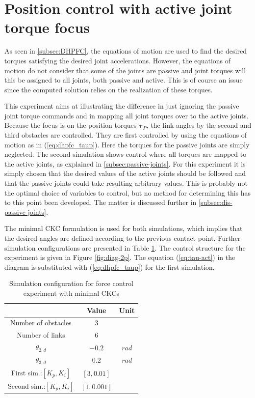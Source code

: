\section{Position control with active joint torque focus}\label{sec:pas-pos}

As seen in \ref{subsec:DHPFC}, the equations of motion are used to find the desired torques satisfying the desired joint accelerations. However, the equations of motion do not consider that some of the joints are passive and joint torques will this be assigned to all joints, both passive and active. This is of course an issue since the computed solution relies on the realization of these torques.

This experiment aims at illustrating the difference in just ignoring the passive joint torque commands and in mapping all joint torques over to the active joints. Because the focus is on the position torques $\boldsymbol{\tau}_P$, the link angles by the second and third obstacles are controlled. They are first controlled by using the equations of motion as in (\ref{eq:dhpfc_taup}). Here the torques for the passive joints are simply neglected. The second simulation shows control where all torques are mapped to the active joints, as explained in \ref{subsec:passive-joints}. For this experiment it is simply chosen that the desired values of the active joints should be followed and that the passive joints could take resulting arbitrary values. This is probably not the optimal choice of variables to control, but no method for determining this has to this point been developed. The matter is discussed further in \ref{subsec:dis-passive-joints}.

The minimal CKC formulation is used for both simulations, which implies that the desired angles are defined according to the previous contact point. Further simulation configurations are presented in Table \ref{tab:exp_2xp}. The control structure for the experiment is given in Figure \ref{fig:diag-2p}. The equation (\ref{eq:tau-act}) in the diagram is substituted with (\ref{eq:dhpfc_taup}) for the first simulation.

\begin{table}[]
    \centering
    \begin{tabular}{|c|c|c|}
        \hline
        & Value & Unit\\
        \hline
        Number of obstacles & $3$ & \\
        Number of links & $6$ & \\
        $\theta_{2,d}$ & $-0.2$ & $rad$ \\
        $\theta_{3,d}$ & $0.2$ & $rad$ \\
        First sim.:$[K_{p}, K_{i}]$ & $[3, 0.01]$ &\\
        Second sim.:$[K_{p}, K_{i}]$ & $[1, 0.001]$ &\\
        \hline
    \end{tabular}
    \caption{Simulation configuration for force control experiment with minimal CKCs}
    \label{tab:exp_2xp}
\end{table}

